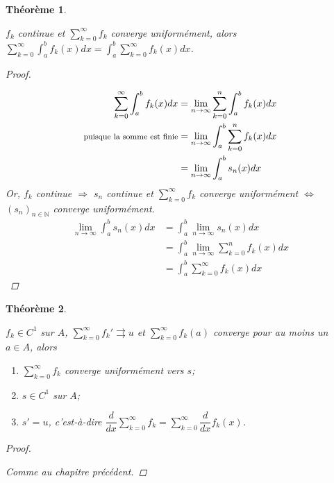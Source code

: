 \documentclass{report}
\newcommand*{\dsum}[4]{\displaystyle\sum_{#1=#2}^{#3}#4}
\newcommand*{\dlim}[3]{\displaystyle\lim_{#1 \to #2}#3}
\newcommand*{\dint}[3]{\displaystyle\int_{#1}^{#2}#3}
\newcommand*{\convuni}{\rightrightarrows}
\newcommand*{\naturels}{\mathbb{N}}
\newtheorem*{thm}{Th\'eor\`eme}
\theoremstyle{definition}
\theoremstyle{remark}
\begin{document}
	\begin{thm}~

		$f_k$ continue et $\dsum{k}{0}{\infty}{f_k}$ converge uniform\'ement, alors $\dsum{k}{0}{\infty}{\dint{a}{b}{f_k(x)dx}} = \dint{a}{b}{\dsum{k}{0}{\infty}{f_k(x)}dx}$.
		\begin{proof}~

			\begin{align*}
				\dsum{k}{0}{\infty}{\dint{a}{b}{f_k(x)dx}}&= \dlim{n}{\infty}{\dsum{k}{0}{n}{\dint{a}{b}{f_k(x)dx}}}\\
				\text{\footnotesize puisque la somme est finie}&= \dlim{n}{\infty}{\dint{a}{b}{\dsum{k}{0}{n}{f_k(x)}dx}}\\
				&= \dlim{n}{\infty}{\dint{a}{b}{s_n(x)dx}}
			\end{align*}
			Or, $f_k$ continue $\Rightarrow$ $s_n$ continue et $\dsum{k}{0}{\infty}{f_k}$ converge uniform\'ement $\Leftrightarrow$ $(s_n)_{n \in \naturels}$ converge uniform\'ement.
			\begin{align*}
				\dlim{n}{\infty}{\dint{a}{b}{s_n(x)dx}}&= \dint{a}{b}{\dlim{n}{\infty}{s_n(x)}dx}\\
				&= \dint{a}{b}{\dlim{n}{\infty}{\dsum{k}{0}{n}{f_k(x)}}dx}\\
				&= \dint{a}{b}{\dsum{k}{0}{\infty}{f_k(x)}dx}
			\end{align*}
		\end{proof}
	\end{thm}
	\begin{thm}~

		$f_k \in C^1$ sur $A$, $\dsum{k}{0}{\infty}{f_k'} \convuni u$ et $\dsum{k}{0}{\infty}{f_k(a)}$ converge pour au moins un $a \in A$, alors
		\begin{enumerate}[label=\alph*)]
			\item $\dsum{k}{0}{\infty}{f_k}$ converge uniform\'ement vers $s$;
			\item $s \in C^1$ sur $A$;
			\item $s'=u$, c'est-\`a-dire $\dfrac{d}{dx}\dsum{k}{0}{\infty}{f_k} = \dsum{k}{0}{\infty}{\dfrac{d}{dx}f_k(x)}$.
		\end{enumerate}
		\begin{proof}~

			Comme au chapitre pr\'ec\'edent.
		\end{proof}
	\end{thm}
\end{document}
